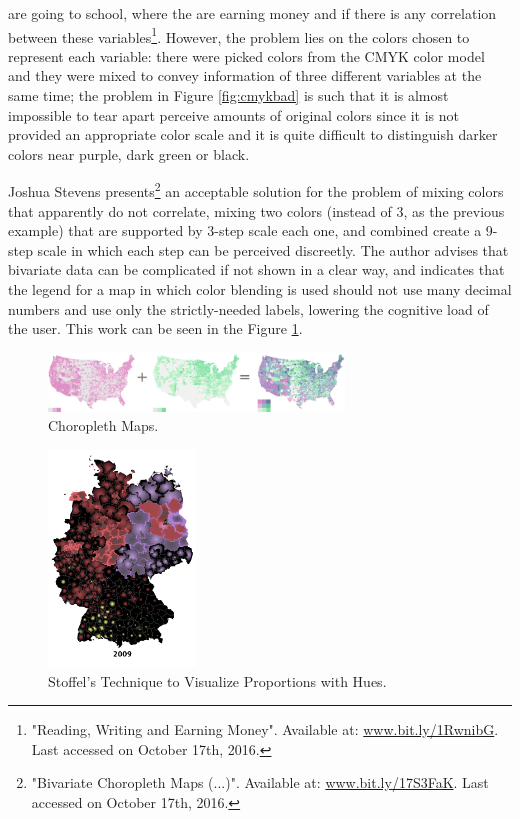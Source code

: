 are going to school, where the are earning money and if there is any correlation between these variables\footnote{"Reading,
Writing and Earning Money". Available at: \url{www.bit.ly/1RwnibG}.
Last accessed on October 17th, 2016.}. However, the problem lies on the colors chosen to represent each variable: there were picked
colors from the CMYK color model and they
were mixed to convey information of three different variables at the same time; the problem in Figure \ref{fig:cmykbad} is such that
it is almost impossible to tear apart perceive amounts of original colors since it is not provided an appropriate color
scale and it is quite difficult to distinguish darker colors near purple, dark green or black. \par
%
Joshua Stevens presents\footnote{"Bivariate Choropleth Maps (...)". Available at:
\url{www.bit.ly/17S3FaK}. Last accessed on October 17th, 2016.} an acceptable
solution for the problem of mixing colors that apparently do not correlate, mixing two colors (instead of 3, as the
previous example) that are supported by 3-step scale each one, and combined create a 9-step scale in which each step
can be perceived discreetly. The author advises that bivariate data can be complicated if not shown in a clear
way, and indicates that the legend for a map in which color blending is used should not use many decimal numbers and use
only the strictly-needed labels, lowering the cognitive load of the user. This work can be seen in the Figure \ref{fig:choropleth}.\\
%
\begin{figure}[H]
	\centering
    \vspace{-10pt}
    \includegraphics[width=0.7\textwidth]{images/background/js_choroMath.png}
    \caption[Bivariate Choropleth Maps]{Choropleth Maps.\protect\footnotemark[20]}
    \vspace{-10pt}
    \label{fig:choropleth}
\end{figure}
%
\begin{figure}
	\centering
    \vspace{-20pt}
    \includegraphics[width=0.35\textwidth]{images/background/stoffel.png}
    \caption[Stoffel's Technique to Visualize Proportions with Hues.]{Stoffel's Technique to Visualize Proportions with Hues. \protect\cite{Stoffel2012}}
    \label{fig:stoffel}
\end{figure}

